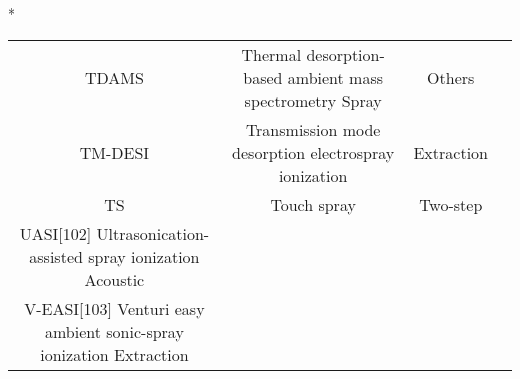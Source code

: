 \begin{table}{*}
\begin{tabular}{|c|c|c|l|}
        TDAMS & Thermal desorption-based ambient mass spectrometry Spray & Others & \cite{20721383} \\
        TM-DESI & Transmission mode desorption electrospray ionization & Extraction & \cite{18684639} \\
        TS & Touch spray & Two-step & \cite{24756256} \\
    UASI[102] Ultrasonication-assisted spray ionization Acoustic \\
    V-EASI[103] Venturi easy ambient sonic-spray ionization Extraction \\
    \hline \hline 
    \end{tabular} 
\end{table}